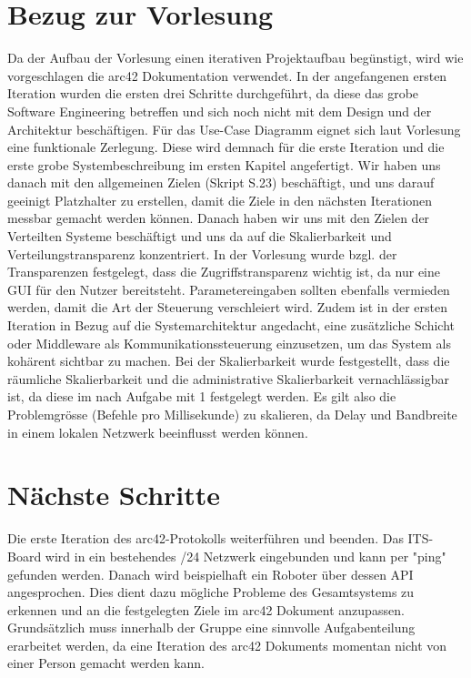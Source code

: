\documentclass{article}
\begin{document}
\section{Bezug zur Vorlesung}
Da der Aufbau der Vorlesung einen iterativen Projektaufbau begünstigt, wird wie vorgeschlagen die arc42 Dokumentation verwendet. In der angefangenen ersten Iteration wurden die ersten drei Schritte durchgeführt, da diese das grobe Software Engineering betreffen und sich noch nicht mit dem Design und der Architektur beschäftigen. Für das Use-Case Diagramm eignet sich laut Vorlesung eine funktionale Zerlegung. Diese wird demnach für die erste Iteration und die erste grobe Systembeschreibung im ersten Kapitel angefertigt. Wir haben uns danach mit den allgemeinen Zielen (Skript S.23) beschäftigt, und uns darauf geeinigt Platzhalter zu erstellen, damit die Ziele in den nächsten Iterationen messbar gemacht werden können. Danach haben wir uns mit den Zielen der Verteilten Systeme beschäftigt und uns da auf die Skalierbarkeit und Verteilungstransparenz konzentriert. In der Vorlesung wurde bzgl. der Transparenzen festgelegt, dass die Zugriffstransparenz wichtig ist, da nur eine GUI für den Nutzer bereitsteht. Parametereingaben sollten ebenfalls vermieden werden, damit die Art der Steuerung verschleiert wird. Zudem ist in der ersten Iteration in Bezug auf die Systemarchitektur angedacht, eine zusätzliche Schicht oder Middleware als Kommunikationssteuerung einzusetzen, um das System als kohärent sichtbar zu machen. Bei der Skalierbarkeit wurde festgestellt, dass die räumliche Skalierbarkeit und die administrative Skalierbarkeit vernachlässigbar ist, da diese im nach Aufgabe mit 1 festgelegt werden. Es gilt also die Problemgrösse (Befehle pro Millisekunde) zu skalieren, da Delay und Bandbreite in einem lokalen Netzwerk beeinflusst werden können. 

\section{Nächste Schritte}
Die erste Iteration des arc42-Protokolls weiterführen und beenden.
Das ITS-Board wird in ein bestehendes /24 Netzwerk eingebunden und kann per "ping" gefunden werden. Danach wird beispielhaft ein Roboter über dessen API angesprochen. Dies dient dazu mögliche Probleme des Gesamtsystems zu erkennen und an die festgelegten Ziele im arc42 Dokument anzupassen. Grundsätzlich muss innerhalb der Gruppe eine sinnvolle Aufgabenteilung erarbeitet werden, da eine Iteration des arc42 Dokuments momentan nicht von einer Person gemacht werden kann.
\end{document}
